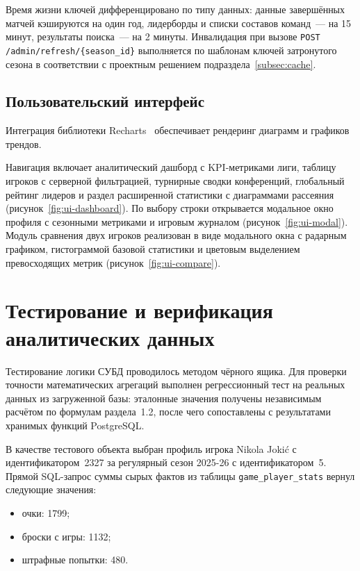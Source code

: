 Время жизни ключей дифференцировано по типу данных: данные завершённых
матчей кэшируются на один год, лидерборды и списки составов команд~---
на 15 минут,
результаты поиска~--- на 2 минуты. Инвалидация при вызове
\texttt{POST /admin/refresh/\{season\_id\}} выполняется по шаблонам ключей
затронутого сезона в соответствии с проектным решением
подраздела~\ref{subsec:cache}.

\subsection{Пользовательский интерфейс}

Интеграция библиотеки Recharts~\cite{recharts} обеспечивает рендеринг
диаграмм и графиков трендов.

Навигация включает аналитический дашборд с KPI-метриками лиги, таблицу
игроков с серверной фильтрацией, турнирные сводки конференций, глобальный
рейтинг лидеров и раздел расширенной статистики с диаграммами рассеяния
(рисунок~\ref{fig:ui-dashboard}). По выбору строки открывается модальное окно
профиля с сезонными метриками и игровым журналом (рисунок~\ref{fig:ui-modal}).
Модуль сравнения двух игроков реализован в виде модального окна
с радарным графиком, гистограммой базовой статистики и цветовым выделением
превосходящих метрик (рисунок~\ref{fig:ui-compare}).

\section{Тестирование и верификация аналитических данных}

Тестирование логики СУБД проводилось методом чёрного ящика. Для проверки
точности математических агрегаций выполнен регрессионный тест на реальных
данных из загруженной базы: эталонные значения получены независимым
расчётом по формулам раздела~1.2, после чего сопоставлены с результатами
хранимых функций PostgreSQL.

В качестве тестового объекта выбран профиль игрока Nikola Joki\'{c}
с идентификатором~2327 за регулярный сезон 2025-26 с идентификатором~5.
Прямой SQL-запрос суммы сырых фактов из таблицы
\texttt{game\_player\_stats} вернул следующие значения:
\begin{itemize}
    \item очки: 1799;
    \item броски с игры: 1132;
    \item штрафные попытки: 480.
\end{itemize}

